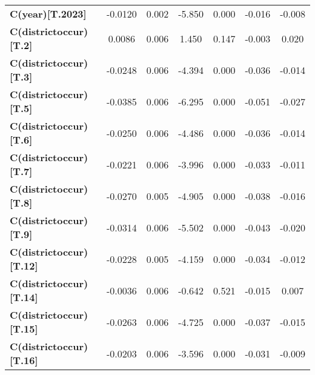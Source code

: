 \begin{center}
\begin{tabular}{lcccccc}
\textbf{C(year)[T.2023]}                                                          &      -0.0120  &        0.002     &    -5.850  &         0.000        &       -0.016    &       -0.008     \\
\textbf{C(districtoccur)[T.2]}                                                    &       0.0086  &        0.006     &     1.450  &         0.147        &       -0.003    &        0.020     \\
\textbf{C(districtoccur)[T.3]}                                                    &      -0.0248  &        0.006     &    -4.394  &         0.000        &       -0.036    &       -0.014     \\
\textbf{C(districtoccur)[T.5]}                                                    &      -0.0385  &        0.006     &    -6.295  &         0.000        &       -0.051    &       -0.027     \\
\textbf{C(districtoccur)[T.6]}                                                    &      -0.0250  &        0.006     &    -4.486  &         0.000        &       -0.036    &       -0.014     \\
\textbf{C(districtoccur)[T.7]}                                                    &      -0.0221  &        0.006     &    -3.996  &         0.000        &       -0.033    &       -0.011     \\
\textbf{C(districtoccur)[T.8]}                                                    &      -0.0270  &        0.005     &    -4.905  &         0.000        &       -0.038    &       -0.016     \\
\textbf{C(districtoccur)[T.9]}                                                    &      -0.0314  &        0.006     &    -5.502  &         0.000        &       -0.043    &       -0.020     \\
\textbf{C(districtoccur)[T.12]}                                                   &      -0.0228  &        0.005     &    -4.159  &         0.000        &       -0.034    &       -0.012     \\
\textbf{C(districtoccur)[T.14]}                                                   &      -0.0036  &        0.006     &    -0.642  &         0.521        &       -0.015    &        0.007     \\
\textbf{C(districtoccur)[T.15]}                                                   &      -0.0263  &        0.006     &    -4.725  &         0.000        &       -0.037    &       -0.015     \\
\textbf{C(districtoccur)[T.16]}                                                   &      -0.0203  &        0.006     &    -3.596  &         0.000        &       -0.031    &       -0.009     \\

\end{tabular}
\end{center}

